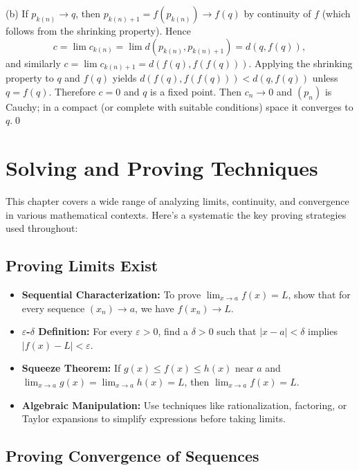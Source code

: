 (b) If $p_{k(n)}\to q$, then $p_{k(n)+1}=f(p_{k(n)})\to f(q)$ by continuity of $f$ (which follows from the shrinking property). Hence
\[
c=\lim c_{k(n)}=\lim d(p_{k(n)},p_{k(n)+1})=d(q,f(q)),
\]
and similarly $c=\lim c_{k(n)+1}=d(f(q),f(f(q)))$. Applying the shrinking property to $q$ and $f(q)$ yields $d(f(q),f(f(q)))<d(q,f(q))$ unless $q=f(q)$. Therefore $c=0$ and $q$ is a fixed point. Then $c_n\to 0$ and $(p_n)$ is Cauchy; in a compact (or complete with suitable conditions) space it converges to $q$.\qed

\section{Solving and Proving Techniques}

This chapter covers a wide range of analyzing limits, continuity, and convergence in various mathematical contexts. Here's a systematic the key proving strategies used throughout:

\subsection*{Proving Limits Exist}

\begin{itemize}
\item \textbf{Sequential Characterization:} To prove $\lim_{x \to a} f(x) = L$, show that for every sequence $(x_n) \to a$, we have $f(x_n) \to L$.

\item \textbf{$\varepsilon$-$\delta$ Definition:} For every $\varepsilon > 0$, find a $\delta > 0$ such that $|x - a| < \delta$ implies $|f(x) - L| < \varepsilon$.

\item \textbf{Squeeze Theorem:} If $g(x) \leq f(x) \leq h(x)$ near $a$ and $\lim_{x \to a} g(x) = \lim_{x \to a} h(x) = L$, then $\lim_{x \to a} f(x) = L$.

\item \textbf{Algebraic Manipulation:} Use techniques like rationalization, factoring, or Taylor expansions to simplify expressions before taking limits.
\end{itemize}

\subsection*{Proving Convergence of Sequences}

